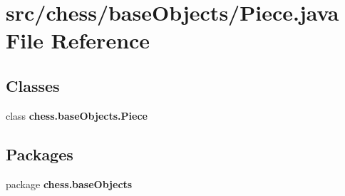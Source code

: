\section{src/chess/base\+Objects/\+Piece.java File Reference}
\label{_piece_8java}
\subsection*{Classes}
\begin{DoxyCompactItemize}
\item 
class {\bf chess.\+base\+Objects.\+Piece}
\end{DoxyCompactItemize}
\subsection*{Packages}
\begin{DoxyCompactItemize}
\item 
package {\bf chess.\+base\+Objects}
\end{DoxyCompactItemize}

